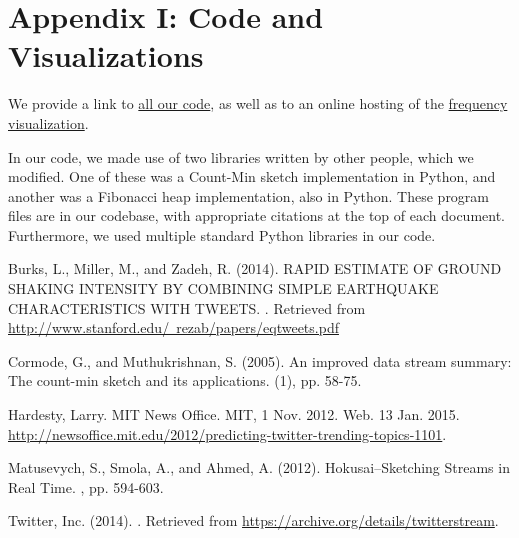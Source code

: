 \documentclass[twoside]{article}
\begin{document}
\section{Appendix I: Code and Visualizations} \label{sec:Appendix_code_viz}

We provide a link to \href{https://github.com/kiranvodrahalli/cos521/}{all our code}, as well as to an online hosting of the \href{http://www.princeton.edu/~awlee/trends.html}{frequency visualization}.

In our code, we made use of two libraries written by other people, which we modified. One of these was a Count-Min sketch implementation in Python, and another was a Fibonacci heap implementation, also in Python. These program files are in our codebase, with appropriate citations at the top of each document. Furthermore, we used multiple standard Python libraries in our code.



\begin{thebibliography}{99} %


Burks, L., Miller, M., and Zadeh, R. (2014). 
\newblock RAPID ESTIMATE OF GROUND SHAKING INTENSITY BY COMBINING SIMPLE EARTHQUAKE CHARACTERISTICS WITH TWEETS. 
. Retrieved from \href{http://www.stanford.edu/~rezab/papers/eqtweets.pdf}{http://www.stanford.edu/~rezab/papers/eqtweets.pdf}

Cormode, G., and Muthukrishnan, S. (2005). 
\newblock An improved data stream summary: The count-min sketch and its applications. 
(1), pp. 58-75.

Hardesty, Larry. 
\newblock MIT News Office. MIT, 1 Nov. 2012. Web. 13 Jan. 2015. \href{http://newsoffice.mit.edu/2012/predicting-twitter-trending-topics-1101}{http://newsoffice.mit.edu/2012/predicting-twitter-trending-topics-1101}.

Matusevych, S., Smola, A., and Ahmed, A. (2012).
\newblock Hokusai--Sketching Streams in Real Time.
, pp. 594-603.

Twitter, Inc. (2014). 
. 
\newblock Retrieved from \href{https://archive.org/details/twitterstream}{https://archive.org/details/twitterstream}.
 
\end{thebibliography}

\end{document}
